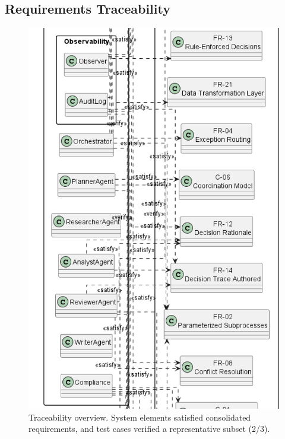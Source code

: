 \subsection{Requirements Traceability}\label{app:trace}
\begin{figure}[htbp]
  \centering
  \includegraphics[width=0.7\linewidth]{ressources/MAS/diagrams/MASTraceability2.png}
  \caption{Traceability overview. System elements satisfied consolidated requirements, and test cases verified a representative subset (2/3).}
  \label{fig:app-mas-traceability}
\end{figure}

\clearpage

